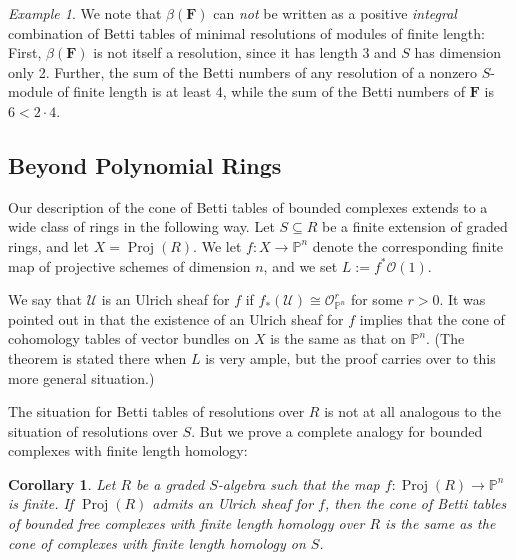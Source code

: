\documentclass[12pt]{amsart}
\newtheorem{cor}[lemma]{Corollary}
\theoremstyle{definition}
\theoremstyle{remark}
\newtheorem{example}[lemma]{Example}
\newcommand{\Proj}{\operatorname{Proj}}
\newcommand{\PP}{\mathbb{P}}
\newcommand{\cO}{\mathcal{O}}
\newcommand{\cU}{\mathcal{U}}
\newcommand{\FF}{\mathbf{F}}
\newcommand{\defi}[1]{\textsf{#1}} %
\renewcommand{\P}{{\mathbb P}}
\begin{document}
\begin{example}
We note that $\beta(\FF)$ can \emph{not} be written as a positive \emph{integral} combination of Betti tables of minimal resolutions of modules of finite length: First, $\beta(\FF)$ is not itself a resolution, since it has length 3 and $S$ has dimension only 2. 
Further,  the sum of the Betti numbers of any resolution of a nonzero $S$-module of finite length is at least 4, while the sum of the Betti numbers of $\FF$ is $6<2\cdot 4$.
\end{example}



\subsection*{Beyond Polynomial Rings}
Our description of the cone of Betti tables of bounded complexes
extends to a wide class of rings in the following way. 
Let $S\subseteq R$ be a finite extension of graded rings, and let
$X=\Proj(R)$.  We let $f\colon X\to \PP^n$ denote the corresponding finite
map of projective schemes of dimension $n$, and we set $L:=f^*\cO(1)$.
%

%

We say that $\cU$ is an \defi{Ulrich sheaf} for $f$ if $f_*(\cU)\cong \cO_{\PP^n}^r$ for some $r>0$.  It was pointed out in \cite[Theorem~5]{eis-schrey-abel} that the existence of an Ulrich sheaf for $f$ implies that  the cone of cohomology tables of vector bundles on $X$ is the same as that on $\PP^{n}$. (The theorem is stated there when $L$ is very ample, but the proof
carries over to this more general situation.) 

The situation for Betti tables of resolutions over $R$ is not at all analogous to the situation of resolutions over $S$. But we prove a complete analogy for bounded complexes with finite length homology:

\begin{cor}\label{cor:isom cones}
Let $R$ be a graded $S$-algebra such that the map $f\colon \Proj(R)\to \P^{n}$ is finite.  If $\Proj(R)$ admits an Ulrich sheaf for $f$, then the cone of Betti tables
of bounded free complexes with finite length homology over  $R$ is the same
as the cone of complexes with finite length homology on $S$. 
\end{cor}
\end{document}
